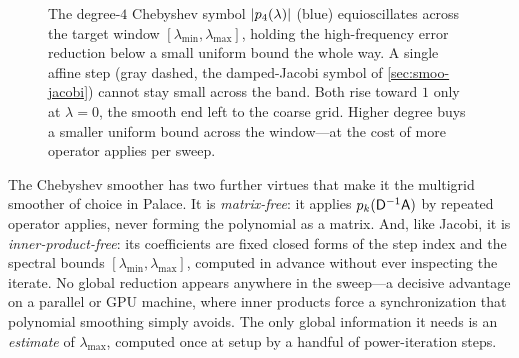 \begin{figure}[t]
\centering
{}
\caption[A Chebyshev polynomial shaped to the spectral window]{The degree-$4$
Chebyshev symbol $\lvert p_4(\lambda)\rvert$ (blue) equioscillates across the target window
$[\lambda_{\min},\lambda_{\max}]$, holding the high-frequency error reduction below a
small uniform bound the whole way. A single affine step (gray dashed, the
damped-Jacobi symbol of \cref{sec:smoo-jacobi}) cannot stay small across the band.
Both rise toward $1$ only at $\lambda=0$, the smooth end left to the coarse grid.
Higher degree buys a smaller uniform bound across the window---at the cost of more
operator applies per sweep.}
\label{fig:smoo-chebpoly}
\end{figure}

The Chebyshev smoother has two further virtues that make it the multigrid smoother
of choice in Palace. It is \emph{matrix-free}: it applies $p_k(\mathsf{D}^{-1}\mathsf{A})$
by repeated operator applies, never forming the polynomial as a matrix. And, like
Jacobi, it is \emph{inner-product-free}: its coefficients are fixed closed forms of
the step index and the spectral bounds $[\lambda_{\min},\lambda_{\max}]$, computed
in advance without ever inspecting the iterate. No global reduction appears anywhere
in the sweep---a decisive advantage on a parallel or GPU machine, where inner
products force a synchronization that polynomial smoothing simply avoids. The only
global information it needs is an \emph{estimate} of $\lambda_{\max}$, computed once
at setup by a handful of power-iteration steps.

